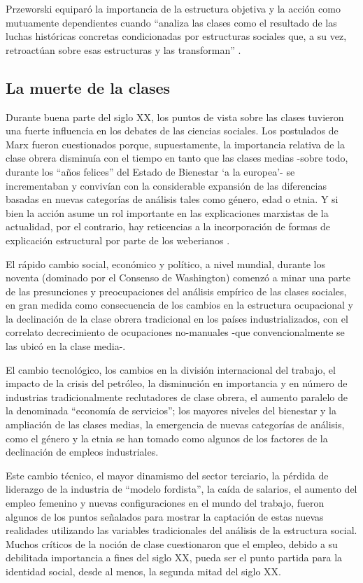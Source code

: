 \documentclass[
]{book}
\begin{document}
Przeworski equiparó la importancia de la estructura objetiva y la acción como mutuamente dependientes cuando ``analiza las clases como el resultado de las luchas históricas concretas condicionadas por estructuras sociales que, a su vez, retroactúan sobre esas estructuras y las transforman'' \citep[p.~133]{Burris1995}.

\hypertarget{la-muerte-de-la-clases}{%
\subsection{La muerte de la clases}\label{la-muerte-de-la-clases}}

Durante buena parte del siglo XX, los puntos de vista sobre las clases tuvieron una fuerte influencia en los debates de las ciencias sociales. Los postulados de Marx fueron cuestionados porque, supuestamente, la importancia relativa de la clase obrera disminuía con el tiempo en tanto que las clases medias -sobre todo, durante los ``años felices'' del Estado de Bienestar `a la europea'- se incrementaban y convivían con la considerable expansión de las diferencias basadas en nuevas categorías de análisis tales como género, edad o etnia. Y si bien la acción asume un rol importante en las explicaciones marxistas de la actualidad, por el contrario, hay reticencias a la incorporación de formas de explicación estructural por parte de los weberianos \citep[p.~136]{Burris1995}.

El rápido cambio social, económico y político, a nivel mundial, durante los noventa (dominado por el Consenso de Washington) comenzó a minar una parte de las presunciones y preocupaciones del análisis empírico de las clases sociales, en gran medida como consecuencia de los cambios en la estructura ocupacional y la declinación de la clase obrera tradicional en los países industrializados, con el correlato decrecimiento de ocupaciones no-manuales -que convencionalmente se las ubicó en la clase media-.

El cambio tecnológico, los cambios en la división internacional del trabajo, el impacto de la crisis del petróleo, la disminución en importancia y en número de industrias tradicionalmente reclutadores de clase obrera, el aumento paralelo de la denominada ``economía de servicios''; los mayores niveles del bienestar y la ampliación de las clases medias, la emergencia de nuevas categorías de análisis, como el género y la etnia se han tomado como algunos de los factores de la declinación de empleos industriales.

Este cambio técnico, el mayor dinamismo del sector terciario, la pérdida de liderazgo de la industria de ``modelo fordista'', la caída de salarios, el aumento del empleo femenino y nuevas configuraciones en el mundo del trabajo, fueron algunos de los puntos señalados para mostrar la captación de estas nuevas realidades utilizando las variables tradicionales del análisis de la estructura social. Muchos críticos de la noción de clase cuestionaron que el empleo, debido a su debilitada importancia a fines del siglo XX, pueda ser el punto partida para la identidad social, desde al menos, la segunda mitad del siglo XX.
\end{document}
